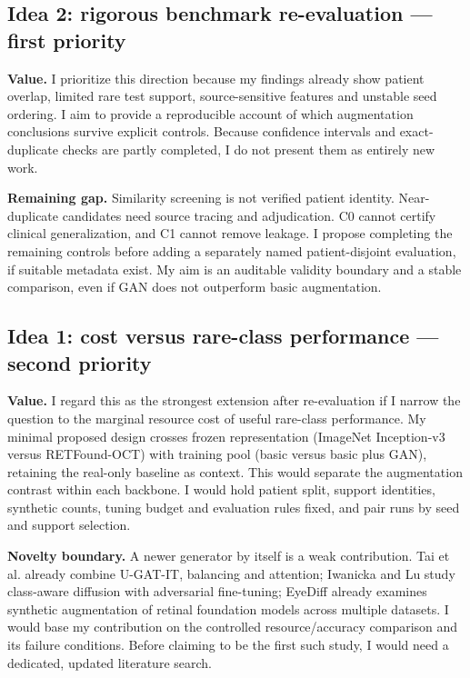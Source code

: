 \documentclass[11pt,a4paper]{article}
\begin{document}
\subsection{Idea 2: rigorous benchmark re-evaluation --- first priority}

\textbf{Value.} I prioritize this direction because my findings already show
patient overlap, limited rare test support, source-sensitive features and
unstable seed ordering. I aim to provide a reproducible account of which
augmentation conclusions survive explicit controls. Because confidence
intervals and exact-duplicate checks are partly completed, I do not present
them as entirely new work.

\textbf{Remaining gap.} Similarity screening is not verified patient identity.
Near-duplicate candidates need source tracing and adjudication. C0 cannot
certify clinical generalization, and C1 cannot remove leakage. I propose
completing the remaining controls before adding a separately named
patient-disjoint evaluation, if suitable metadata exist. My aim is an auditable
validity boundary and a stable comparison, even if GAN does not outperform
basic augmentation.

\subsection{Idea 1: cost versus rare-class performance --- second priority}

\textbf{Value.} I regard this as the strongest extension after re-evaluation
if I narrow the question to the marginal resource cost of useful rare-class
performance. My minimal proposed design crosses frozen representation
(ImageNet Inception-v3 versus RETFound-OCT) with training pool
(basic versus basic plus GAN), retaining the real-only baseline as context.
This would separate the augmentation contrast within each backbone. I would
hold patient split, support identities, synthetic counts, tuning budget and
evaluation rules fixed, and pair runs by seed and support selection.

\textbf{Novelty boundary.} A newer generator by itself is a weak contribution.
Tai et al. already combine U-GAT-IT, balancing and attention; Iwanicka and Lu
study class-aware diffusion with adversarial fine-tuning; EyeDiff already
examines synthetic augmentation of retinal foundation models across multiple
datasets. I would base my contribution on the controlled resource/accuracy
comparison and its failure conditions. Before claiming to be the first such
study, I would need a dedicated, updated literature search.
\cite{tai2025,iwanicka,eyediff}
\end{document}
